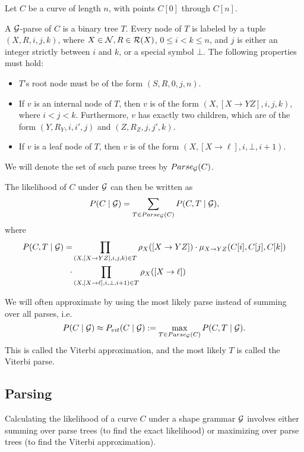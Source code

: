 \documentclass{article}
\def\m{\ema}
\begin{document}
\begin{defn}
Let $C$ be a curve of length $n$, with points $C[0]$ through $C[n]$.

A ${\mathcal G}$-parse of $C$ is a binary tree $T$. Every node of $T$ is
labeled by a tuple $(X,R,i,j,k)$, where $X\in {\mathcal N}, R\in {\mathcal R}(X)$,
$0\le i < k \le n$, and $j$ is either an integer strictly between $i$
and $k$, or a special symbol $\bot$. The following properties must
hold: 
\begin{itemize}
\item $T$'s root node must be of the form $(S,R,0,j,n)$.
\item If $v$ is an internal node of $T$, then $v$ is of the form $(X,
  [X\to YZ], i, j, k)$, where $i < j < k$. Furthermore, $v$ has
  exactly two children, which are of the form $(Y,R_Y,i,i',j)$ and
  $(Z, R_Z, j, j', k)$.
\item If $v$ is a leaf node of $T$, then $v$ is of the form $(X, [X\to
  \ell], i, \bot, i+1)$.
\end{itemize}
We will denote the set of such parse trees by $Parse_{{\mathcal G}}(C)$. 
\end{defn}
The likelihood of $C$ under ${\mathcal G}$ can then be written as
$$P(C\mid {\mathcal G}) = \sum_{T\in Parse_{{\mathcal G}}(C)} P(C,T\mid {\mathcal G}),$$
where
\begin{align}
\label{joint-likelihood}
P(C,T\mid {\mathcal G}) = &\prod_{(X,[X\to YZ],i,j,k)\in T} \rho_X([X\to YZ])
\cdot \mu_{X\to YZ}(C[i], C[j], C[k]) \\
\nonumber
\cdot &\prod_{(X,[X\to \ell],i,\bot,i+1)\in T} \rho_X([X\to \ell])
\end{align}

\def\Vbin{\ema{V_{bin}}}
\def\Vlex{\ema{V_{lex}}}
\newcommand\unirule[1]{\ema{[#1 \to \ell]}}
\newcommand\binrule[3]{\ema{[#1 \to #2 #3]}}
\newcommand\parseset[1]{\m{Parse_{\GGG}(#1)}}

We will often approximate \m{P(C\mid \GGG)} by using the most likely
parse instead of summing over all parses, i.e.
$$P(C\mid\GGG) \approx P_{vit}(C\mid\GGG) := \max_{T\in \parseset{C}}
P(C,T\mid \GGG).$$ This is called the Viterbi approximation, and the
most likely $T$ is called the Viterbi parse.

\subsection{Parsing}
\label{sec-parsing}

Calculating the likelihood of a curve $C$ under a shape grammar ${\mathcal G}$
involves either summing over parse trees (to find the exact
likelihood) or maximizing over parse trees (to find the Viterbi
approximation). 
\end{document}
